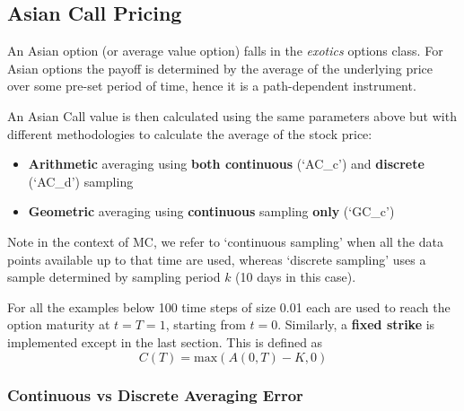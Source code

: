 \documentclass{article}
\providecommand{\tightlist}{%
      \setlength{\itemsep}{0pt}\setlength{\parskip}{0pt}}
\begin{document}
        
    \begin{center}
    \end{center}

    
    \subsection{Asian Call Pricing}\label{asian-call-pricing}

An Asian option (or average value option) falls in the {\it{exotics}} options class. For Asian options the payoff is determined by the average of the underlying price over some pre-set period of time, hence it is a path-dependent instrument.

An Asian Call value is then calculated using the same parameters above
but with different methodologies to calculate the average of the stock
price:

\begin{itemize}
\tightlist
\item
  \textbf{Arithmetic} averaging using \textbf{both continuous} (`AC\_c')
  and \textbf{discrete} (`AC\_d') sampling
\item
  \textbf{Geometric} averaging using \textbf{continuous} sampling
  \textbf{only} (`GC\_c')
\end{itemize}

Note in the context of MC, we refer to `continuous sampling' when all the
data points available up to that time are used, whereas `discrete
sampling' uses a sample determined by sampling period $k$ (10 days in
this case).

For all the examples below 100 time steps of size 0.01 each are used to reach the option maturity at $t=T=1$, starting from $t=0$. Similarly, a \textbf{fixed strike} is implemented except in the last section. This is defined as
\begin{equation}
C(T) = \text{max}\left( A(0,T) - K, 0 \right)
\end{equation}


    \subsubsection{Continuous vs Discrete
Averaging Error}\label{continuous-vs-discrete-sampling}
\end{document}
